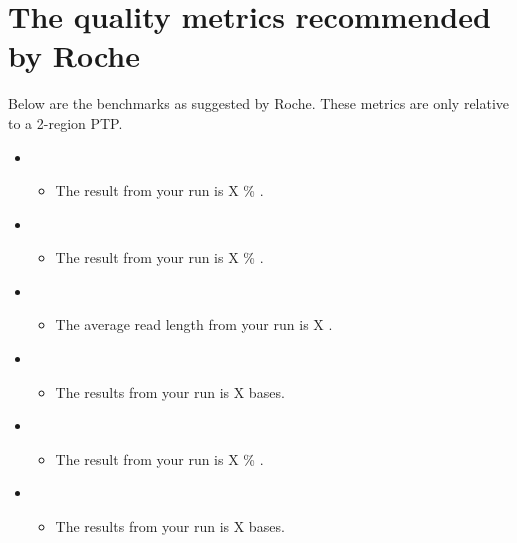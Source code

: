 \documentclass[11pt]{article}
\begin{document}
\section{The quality metrics recommended by Roche}

Below are the benchmarks as suggested by Roche.  These metrics are only 
relative to a 2-region PTP.

\begin{itemize}
    \item %
        \begin{itemize}
            \item The result from your run is X \% .
        \end{itemize}
    \item %
     	\begin{itemize}
	    \item The result from your run is X \% .
    	\end{itemize}
    \item %
	\begin{itemize}
	    \item The average read length from your run is X .
        \end{itemize}
    \item %
	\begin{itemize}
	    \item The results from your run is X bases.
	\end{itemize}
    \item %
        \begin{itemize}
            \item The result from your run is X \% .
        \end{itemize}
    \item %
        \begin{itemize}
            \item The results from your run is X bases.
        \end{itemize}
\end{itemize}
\end{document}
